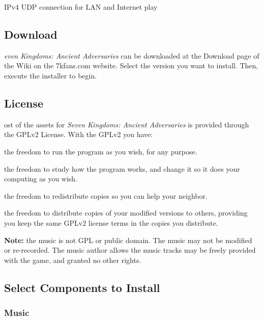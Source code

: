 
\begin{changemargin}{0.5cm}{0cm} 
IPv4 UDP connection for LAN and Internet play
\end{changemargin}

\subsection{Download}

\textit{even Kingdoms: Ancient Adversaries} can be downloaded at the Download page of the Wiki on the 7kfans.com website. Select the version you want to install. Then, execute the installer to begin.

\subsection{License}


ost of the assets for \textit{Seven Kingdoms: Ancient Adversaries} is provided through the GPLv2 License. With the GPLv2 you have: 

\begin{changemargin}{0.5cm}{0cm}
the freedom to run the program as you wish, for any purpose.

the freedom to study how the program works, and change it so it does your computing as you wish.

the freedom to redistribute copies so you can help your neighbor.

the freedom to distribute copies of your modified versions to others, providing you keep the same GPLv2 license terms in the copies you distribute.
\end{changemargin}


\textbf{Note:} the music is not GPL or public domain. The music may not be modified or re-recorded. The music author allows the music tracks may be freely provided with the game, and granted no other rights.

\subsection{Select Components to Install}


\subsubsection{Music}

